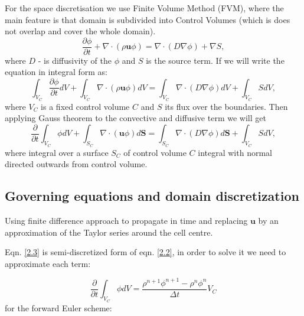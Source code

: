 For the space discretisation we use Finite Volume Method (FVM), where the main feature is that domain is subdivided into Control Volumes (which is does not overlap and cover the whole domain).
\begin{equation}\label{2.2}
\frac{\partial\phi}{\partial t} +\nabla \cdot(\rho\mathbf{u}\phi) = \nabla \cdot(D \nabla \phi) + \nabla S ,
\end{equation}
where $D$ -  is diffusivity of the $\phi$ and $S$ is the source term. If we will write the equation in integral form as:
\begin{equation}
\int_{V_C} \frac{\partial\phi}{\partial t} d V+\int_{V_C} \nabla \cdot(\rho\mathbf{u}\phi) d V = \int_{V_C} \nabla \cdot(D \nabla \phi) d V + \int_{V_C} S d V,
\end{equation}
where $V_C$ is a fixed control volume $C$ and $S$ its flux over the boundaries. Then applying Gauss theorem to the convective and diffusive term we will get
\begin{equation}\label{2.3}
\frac{\partial}{\partial t}\int_{V_C} \phi d V+\int_{S_C} \nabla \cdot(\mathbf{u}\phi) d \mathbf{S} = \int_{S_C} \nabla \cdot(D \nabla \phi) d \mathbf{S} + \int_{V_C} S d V,
\end{equation}
where integral over a surface $S_C$ of control volume $C$ integral with normal directed outwards from control volume.
\subsection{Governing equations and domain discretization}
Using finite difference approach to propagate in time and replacing $\mathbf{u}$ by an approximation of the Taylor series around the cell centre.

Eqn. \ref{2.3} is semi-discretized form of eqn. \ref{2.2}, in order to solve it we need to approximate each term:

\begin{equation}
    \frac{\partial}{\partial t}\int_{V_C} \phi d V = \frac{ \rho^{n+1} \phi^{n+1} -  \rho^{n}\phi^{n} }{\Delta t} V_C
\end{equation}
for the forward Euler scheme:

